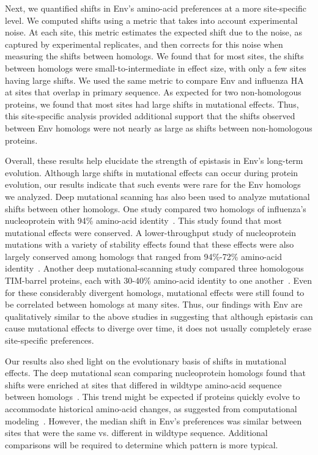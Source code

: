 \documentclass[9pt]{elife}
\begin{document}
Next, we quantified shifts in Env's amino-acid preferences at a more site-specific level.
We computed shifts using a metric that takes into account experimental noise.
At each site, this metric estimates the expected shift due to the noise, as captured by experimental replicates, and then corrects for this noise when measuring the shifts between homologs.
We found that for most sites, the shifts between homologs were small-to-intermediate in effect size, with only a few sites having large shifts.
We used the same metric to compare Env and influenza HA at sites that overlap in primary sequence.
As expected for two non-homologous proteins, we found that most sites had large shifts in mutational effects.
Thus, this site-specific analysis provided additional support that the shifts observed between Env homologs were not nearly as large as shifts between non-homologous proteins.

Overall, these results help elucidate the strength of epistasis in Env's long-term evolution.
Although large shifts in mutational effects can occur during protein evolution, our results indicate that such events were rare for the Env homologs we analyzed.
Deep mutational scanning has also been used to analyze mutational shifts between other homologs.
One study compared two homologs of influenza's nucleoprotein with 94\% amino-acid identity~\cite{doud2015site}.
This study found that most mutational effects were conserved.
A lower-throughput study of nucleoprotein mutations with a variety of stability effects found that these effects were also largely conserved among homologs that ranged from 94\%-72\% amino-acid identity~\cite{ashenberg2013mutational}.
Another deep mutational-scanning study compared three homologous TIM-barrel proteins, each with 30-40\% amino-acid identity to one another~\cite{chan2017correlation}.
Even for these considerably divergent homologs, mutational effects were still found to be correlated between homologs at many sites.
Thus, our findings with Env are qualitatively similar to the above studies in suggesting that although epistasis can cause mutational effects to diverge over time, it does not usually completely erase site-specific preferences.

Our results also shed light on the evolutionary basis of shifts in mutational effects.
The deep mutational scan comparing nucleoprotein homologs found that shifts were enriched at sites that differed in wildtype amino-acid sequence between homologs~\cite{doud2015site}.
This trend might be expected if proteins quickly evolve to accommodate historical amino-acid changes, as suggested from computational modeling~\cite{pollock2012amino}.
However, the median shift in Env's preferences was similar between sites that were the same vs. different in wildtype sequence.
Additional comparisons will be required to determine which pattern is more typical.
\end{document}

